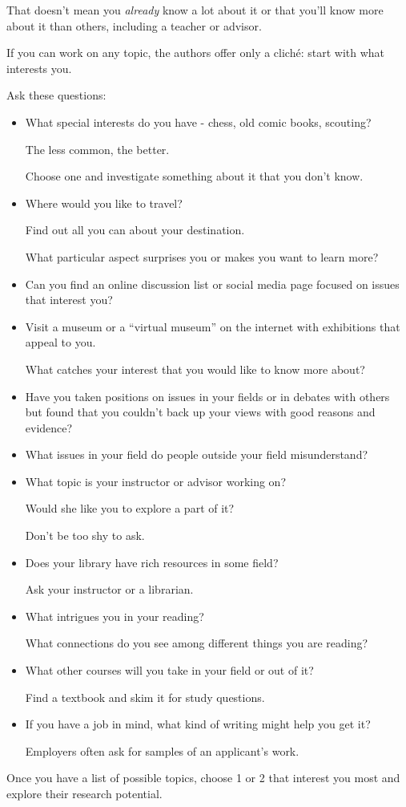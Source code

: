 \documentclass[oneside]{book}
\numberwithin{equation}{section}
\begin{document}
That doesn't mean you \textit{already} know a lot about it or that you'll know more about it than others, including a teacher or advisor.


%
If you can work on any topic, the authors offer only a clich\'e: start with what interests you.

Ask these questions:
\begin{itemize}
    \item What special interests do you have - chess, old comic books, scouting?
    
    The less common, the better.
    
    Choose one and investigate something about it that you don't know.
    \item Where would you like to travel?
    
    Find out all you can about your destination.
    
    What particular aspect surprises you or makes you want to learn more?
    \item Can you find an online discussion list or social media page focused on issues that interest you?
    \item Visit a museum or a ``virtual museum'' on the internet with exhibitions that appeal to you.
    
    What catches your interest that you would like to know more about?
    \item Have you taken positions on issues in your fields or in debates with others but found that you couldn't back up your views with good reasons and evidence?
    \item What issues in your field do people outside your field misunderstand?
    \item What topic is your instructor or advisor working on?
    
    Would she like you to explore a part of it?
    
    Don't be too shy to ask.
    \item Does your library have rich resources in some field?
    
    Ask your instructor or a librarian.
    \item What intrigues you in your reading?
    
    What connections do you see among different things you are reading?
    \item What other courses will you take in your field or out of it?
    
    Find a textbook and skim it for study questions.
    \item If you have a job in mind, what kind of writing might help you get it?
    
    Employers often ask for samples of an applicant's work.
\end{itemize}
Once you have a list of possible topics, choose 1 or 2 that interest you most and explore their research potential.
\end{document}
